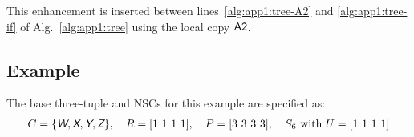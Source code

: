This enhancement is inserted between lines~\ref{alg:app1:tree-A2} and \ref{alg:app1:tree-if} of Alg.~\ref{alg:app1:tree} using the local copy $\textup{\textsf{A2}}$.

\subsection{Example}

The base three-tuple and NSCs for this example are specified as:
\begin{align}
C = \{ \xcolor{W}, \xcolor{X}, \xcolor{Y}, \xcolor{Z} \}, \quad R = [1\ 1\ 1\ 1], \quad P = [3\ 3\ 3\ 3], \quad S_6 \text{ with } U = [1\ 1\ 1\ 1]
\end{align}


\newcommand{\rhilght}[1]{\cancel{#1}}
\newcommand{\ghilght}[1]{#1}

